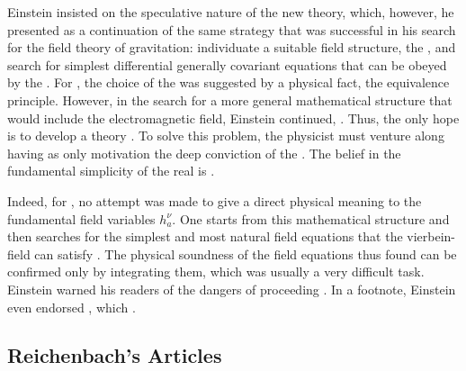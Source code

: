 \documentclass[draft]{article}
\newcommand{\vbein}{vierbein\xspace}
\newcommand{\hbein}{\ensuremath{h_{a}^{\nu}}\xspace}
\newcommand{\FP}{\german{Fernparallelismus}\xspace}
\begin{document}
Einstein insisted on the speculative nature of the new theory, which, however, he presented as a continuation of the same strategy that was successful in his search for the field theory of gravitation: individuate a suitable field structure, the \gmn, and search for simplest differential generally covariant equations that can be obeyed by the \gmn. For \gr, the choice of the \gmn was suggested by a physical fact, the equivalence principle. However, in the search for a more general mathematical structure that would include the electromagnetic field, Einstein continued,  \citep[128]{Einstein1929}.  Thus, the only hope is to develop a theory  \citep[128]{Einstein1929}. To solve this problem, the physicist must venture along  having as only motivation the deep conviction of the  \citep[127]{Einstein1929}. The belief in the fundamental simplicity of the real is  \citep[127]{Einstein1929}. 

Indeed, for \FP, no attempt was made to give a direct physical meaning to the fundamental field variables \hbein. One starts from this mathematical structure and then searches for the simplest and most natural field equations that the \vbein-field can satisfy \citep[131]{Einstein1929}. The physical soundness of the field equations thus found can be confirmed only by integrating them, which was usually a very difficult task. Einstein warned his readers of the dangers of proceeding  \citep[127]{Einstein1929}. In a footnote, Einstein even endorsed , which  \citep[127]{Einstein1929}.

\subsection{Reichenbach's Articles}
\end{document}
